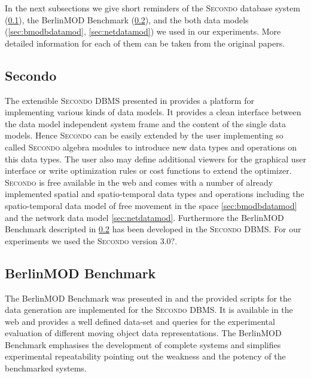 \documentclass[a4paper]{article}
\newcommand{\secondo}{\textsc{Secondo}}
\newcommand{\bmodb} {BerlinMOD Benchmark}
\newcommand{\secver}{3.0?}
\begin{document}
In the next subsections we give short reminders of the \secondo{} database system (\ref{sec:secondo}), the \bmodb{} (\ref{sec:bmodb}), and the both data models (\ref{sec:bmodbdatamod}, \ref{sec:netdatamod}) we used in our experiments. More
detailed information for each of them can be taken from the original papers.
\subsection{Secondo}
\label{sec:secondo}
The extensible \secondo{} DBMS presented in \cite{686903,1054151} provides a
platform for implementing various kinds of data models. It provides a clean
interface between the data model independent system frame and the content of the
 single data models. Hence \secondo{} can be easily extended by the user
implementing so called \secondo{} algebra modules to introduce  new data types
and operations on this data types. The user also may define additional viewers
for the graphical user interface or write optimization rules or cost functions
to extend the optimizer. \secondo{} is free available in the web \cite{secondoweb}
and comes with a number of already implemented spatial and spatio-temporal data types
and operations including the spatio-temporal data model of free movement in the space \ref{sec:bmodbdatamod} and the network data model \ref{sec:netdatamod}. Furthermore the \bmodb{} descripted in \ref{sec:bmodb} has been developed in the \secondo{} DBMS.
For our experiments we used the \secondo{} version \secver{}.
\subsection{BerlinMOD Benchmark}
\label{sec:bmodb}
The \bmodb{} was presented in \cite{BerlinMODVLDB} \nocite{BerlinMOD} and the
provided scripts for the data generation are implemented for the \secondo{} DBMS.
It is available in the web \cite{berlinmodweb} and provides a well defined
data-set and queries for the experimental evaluation of different moving object
data representations. The \bmodb{} emphasises the development of complete systems
and simplifies experimental repeatability pointing out the weakness and the potency
of the benchmarked systems.
\end{document}

